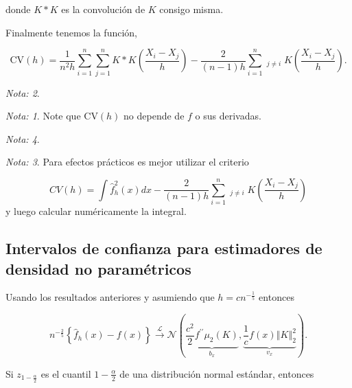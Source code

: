 \documentclass[
  12pt,
]{book}
\theoremstyle{definition}
\theoremstyle{definition}
\theoremstyle{definition}
\theoremstyle{remark}
\newtheorem*{remark}{Nota: }
\begin{document}
donde \(K*K\) es la convolución de \(K\) consigo misma.

Finalmente tenemos la función,

\[
\mathrm{CV}(h)=\frac{1}{n^{2}h}\sum_{i=1}^{n}\sum_{j=1}^{n}K*K\left(\frac{X_{i}-X_{j}}{h}\right)-\frac{2}{(n-1)h}\sum_{i=1}^{n}\mathop{\sum_{j=1}^{n}}_{j\neq i}K\left( \frac{X_{i}-X_{j}}{h} \right).
\]

\begin{remark}
\begin{remark}

{}Note que \(\mathrm{CV}(h)\) no depende de \(f\) o sus derivadas.

\end{remark}
\end{remark}

\begin{remark}
\begin{remark}

{}Para efectos prácticos es mejor utilizar el criterio

\[
CV(h)=\int\hat{f}_{h}^{2}(x)dx-\frac{2}{(n-1)h}\sum_{i=1}^{n}\mathop{\sum_{j=1}^{n}}_{j\neq i}K\left( \frac{X_{i}-X_{j}}{h} \right)
\]
y luego calcular numéricamente la integral.

\end{remark}
\end{remark}

\hypertarget{intervalos-de-confianza-para-estimadores-de-densidad-no-paramuxe9tricos}{%
\subsection{Intervalos de confianza para estimadores de densidad no paramétricos}\label{intervalos-de-confianza-para-estimadores-de-densidad-no-paramuxe9tricos}}

Usando los resultados anteriores y asumiendo que \(h=cn^{-\frac{1}{5}}\) entonces

\begin{equation*}
n^{-\frac{2}{5}} \left\{ \hat{f}_{h}(x) -f(x)\right\}
\xrightarrow{\mathcal{L}} \mathcal{N}\left(\underbrace{\frac{c^{2}}{2} f^{\prime\prime}
\mu_{2}(K)}_{b_{x}}, \underbrace{\frac{1}{c}f(x) \left\Vert K \right\Vert_{2}^{2}}_{v_{x}}\right).
\end{equation*}

Si \(z_{1-\frac{\alpha}{2}}\) es el cuantil \(1-\frac{\alpha}{2}\) de una distribución normal estándar, entonces
\end{document}
